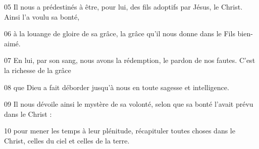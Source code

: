 
05 Il nous a prédestinés à être, pour lui, des fils adoptifs par Jésus, le Christ. Ainsi l’a voulu sa bonté,

06 à la louange de gloire de sa grâce, la grâce qu’il nous donne dans le Fils bien-aimé.

07 En lui, par son sang, nous avons la rédemption, le pardon de nos fautes. C’est la richesse de la grâce

08 que Dieu a fait déborder jusqu’à nous en toute sagesse et intelligence.

09 Il nous dévoile ainsi le mystère de sa volonté, selon que sa bonté l’avait prévu dans le Christ :

10 pour mener les temps à leur plénitude, récapituler toutes choses dans le Christ, celles du ciel et celles de la terre.
